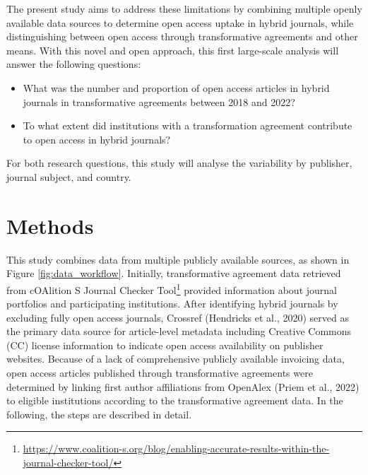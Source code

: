 \documentclass[a4paper,man,floatsintext,longtable,noextraspace,12pt]{apa6}
\providecommand{\tightlist}{%
  \setlength{\itemsep}{0pt}\setlength{\parskip}{0pt}}
\begin{document}
The present study aims to address these limitations by combining
multiple openly available data sources to determine open access uptake
in hybrid journals, while distinguishing between open access through
transformative agreements and other means. With this novel and open
approach, this first large-scale analysis will answer the following
questions:

\begin{itemize}
\tightlist
\item
  What was the number and proportion of open access articles in hybrid
  journals in transformative agreements between 2018 and 2022?
\item
  To what extent did institutions with a transformation agreement
  contribute to open access in hybrid journals?
\end{itemize}

For both research questions, this study will analyse the variability by
publisher, journal subject, and country.

\section{Methods}\label{methods}

This study combines data from multiple publicly available sources, as
shown in Figure \ref{fig:data_workflow}. Initially, transformative
agreement data retrieved from cOAlition S Journal Checker
Tool\footnote{\url{https://www.coalition-s.org/blog/enabling-accurate-results-within-the-journal-checker-tool/}}
provided information about journal portfolios and participating
institutions. After identifying hybrid journals by excluding fully open
access journals, Crossref (Hendricks et al., 2020) served as the primary
data source for article-level metadata including Creative Commons (CC)
license information to indicate open access availability on publisher
websites. Because of a lack of comprehensive publicly available
invoicing data, open access articles published through transformative
agreements were determined by linking first author affiliations from
OpenAlex (Priem et al., 2022) to eligible institutions according to the
transformative agreement data. In the following, the steps are described
in detail.
\end{document}
